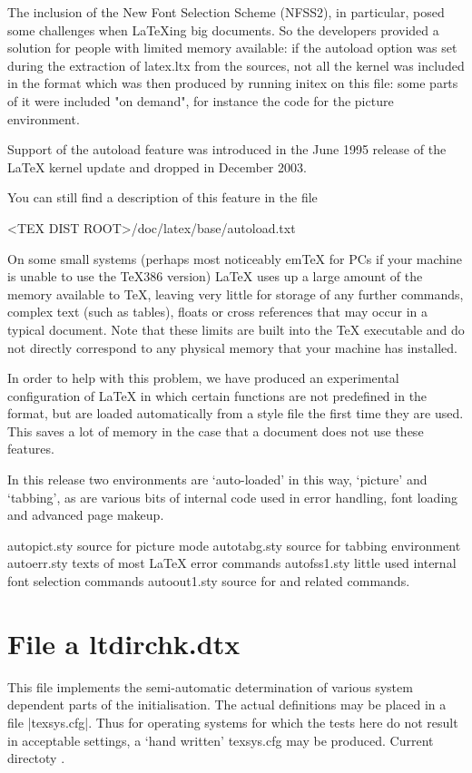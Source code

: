 The inclusion of the New Font Selection Scheme (NFSS2), in particular, posed some challenges when LaTeXing big documents. So the developers provided a solution for people with limited memory available: if the autoload option was set during the extraction of latex.ltx from the sources, not all the kernel was included in the format which was then produced by running initex on this file: some parts of it were included "on demand", for instance the code for the picture environment.

Support of the autoload feature was introduced in the June 1995 release of the LaTeX kernel update and dropped in December 2003.

You can still find a description of this feature in the file

<TEX DIST ROOT>/doc/latex/base/autoload.txt

On some small systems (perhaps most noticeably emTeX for PCs if your machine is unable to use the TeX386 version) LaTeX uses up a large amount of the memory available to TeX, leaving very little for storage of any further commands, complex text (such as tables), floats or cross references that may occur in a typical document. Note that these limits are built into the TeX executable and do not directly correspond to any physical memory that your machine has installed.

In order to help with this problem, we have produced an experimental configuration of LaTeX in which certain functions are not predefined in the format, but are loaded automatically from a style file the first time they are used. This saves a lot of memory in the case that a document does not use these features.

In this release two environments are ‘auto-loaded’ in this way, ‘picture’ and ‘tabbing’, as are various bits of internal code used in error handling, font loading and advanced page makeup.

  autopict.sty      source for picture mode
  autotabg.sty      source for tabbing environment
  autoerr.sty       texts of most LaTeX error commands
  autofss1.sty      little used internal font selection commands
  autoout1.sty      source for  and related commands.

\makeatletter

\section{File a ltdirchk.dtx}
This file implements the semi-automatic determination of various system dependent
parts of the initialisation. The actual definitions may be placed in a file
|texsys.cfg|. Thus for operating systems for which the tests here do not result in
acceptable settings, a `hand written' texsys.cfg may be produced.
Current directoty .



